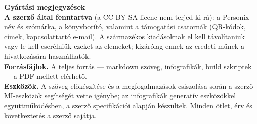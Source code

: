 \clearpage
\thispagestyle{empty}
\begin{flushleft}\small\sffamily
\textbf{Gyártási megjegyzések}\\[1.2em]

\textbf{A szerző által fenntartva} (a CC BY-SA licenc nem terjed ki rá): a
Personix név és szómárka, a könyvborító, valamint a támogatási csatornák (QR-kódok,
címek, kapcsolattartó e-mail). A származékos kiadásoknak el kell távolítaniuk vagy
le kell cserélniük ezeket az elemeket; kizárólag ennek az eredeti műnek a
hivatkozására használhatók.\\[1.2em]

\textbf{Forrásfájlok.} A teljes forrás --- markdown szöveg, infografikák,
build szkriptek --- a PDF mellett elérhető.\\[1.2em]

\textbf{Eszközök.} A szöveg előkészítése és a megfogalmazások csiszolása során a
szerző MI-eszközök segítségét vette igénybe; az infografikák generatív
eszközökkel együttműködésben, a szerző specifikációi alapján készültek.
Minden ötlet, érv és következtetés a szerző sajátja.
\end{flushleft}
\clearpage
